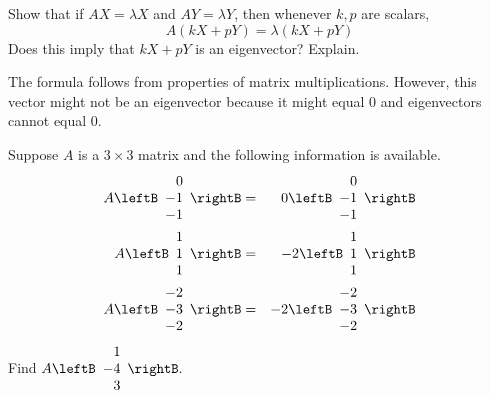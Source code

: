 \begin{enumialphparenastyle}
\begin{ex} Show that if $AX=\lambda X$ and $AY=\lambda Y$, then whenever $k,p$ are scalars,
\begin{equation*}
A\left( kX+pY\right) =\lambda \left( kX+pY\right) 
\end{equation*}
Does this imply that $kX+pY$ is an eigenvector? Explain.
\vspace{1mm} 
\begin{sol}
The formula follows from properties of matrix multiplications. However,
this vector might not be an eigenvector because it might equal $0$
and eigenvectors cannot equal $0$. 
\end{sol}
\end{ex}

\begin{ex} Suppose $A$ is a $3\times 3$ matrix and the following information is
available. 
\begin{eqnarray*}
A\leftB
\begin{array}{r}
0 \\
-1 \\
-1
\end{array}
\rightB &=&0\leftB
\begin{array}{r}
0 \\
-1 \\
-1
\end{array}
\rightB \\
A\leftB
\begin{array}{r}
1 \\
1 \\
1
\end{array}
\rightB &=&-2\leftB
\begin{array}{r}
1 \\
1 \\
1
\end{array}
\rightB \\
A\leftB
\begin{array}{r}
-2 \\
-3 \\
-2
\end{array}
\rightB &=&-2\leftB
\begin{array}{r}
-2 \\
-3 \\
-2
\end{array}
\rightB
\end{eqnarray*}
Find $A\leftB
\begin{array}{r}
1 \\
-4 \\
3
\end{array}
\rightB. $
\end{ex}


\end{enumialphparenastyle}

